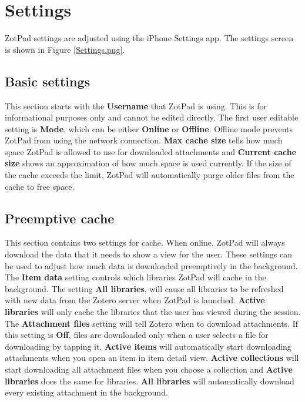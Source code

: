 \documentclass[oneside, openany, 12pt]{tufte-book}
\newcommand{\iphone}[1]{#1}
\newcommand{\ipad}[1]{}
\newcommand{\image}[2]{
	\center
	\fbox{\texttt{[image: images/iPhone/\{\#2]}}}

	\refstepcounter{figure}
	\smallskip\noindent\small Figure \thefigure: #1
	\label{#2}
	}
\newcommand{\iphone}[1]{}
\newcommand{\ipad}[1]{#1}
\newcommand{\image}[2]{
	\caption{#1}
	\label{#2}
	\fbox{\texttt{[image: images/iPad/\{\#2]}}}
	}
\begin{document}
\begin{figure}
\image{Conflict resolution}{Conflict.png}
\end{figure}

\clearpage

\chapter{Settings}
\label{Settings}

ZotPad settings are adjusted using the \ipad{iPad}\iphone{iPhone} Settings app. The settings screen is shown in Figure \ref{Settings.png}. 

\begin{figure}
\image{ZotPad settings}{Settings.png}
\end{figure}

\section{Basic settings}

This section starts with the \textbf{Username} that ZotPad is using. This is for informational purposes only and cannot be edited directly. The first user editable setting is \textbf{Mode}, which can be either \textbf{Online} or \textbf{Offline}. Offline mode prevents ZotPad from using the network connection. \textbf{Max cache size} tells how much space ZotPad is allowed to use for downloaded attachments and \textbf{Current cache size} shows an approximation of how much space is used currently. If the size of the cache exceeds the limit, ZotPad will automatically purge older files from the cache to free space.

\section{Preemptive cache}

This section contains two settings for cache. When online, ZotPad will always download the data that it needs to show a view for the user. These settings can be used to adjust how much data is downloaded preemptively in the background. The \textbf{Item data} setting controls which libraries ZotPad will cache in the background. The setting \textbf{All libraries}, will cause all libraries to be refreshed with new data from the Zotero server when ZotPad is launched. \textbf{Active libraries} will only cache the libraries that the user has viewed during the session. The \textbf{Attachment files} setting will tell Zotero when to download attachments. If this setting is \textbf{Off}, files are downloaded only when a user selects a file for downloading by tapping it. \textbf{Active items} will automatically start downloading attachments when you open an item in item detail view. \textbf{Active collections} will start downloading all attachment files when you choose a collection and \textbf{Active libraries} does the same for libraries. \textbf{All libraries} will automatically download every existing attachment in the background.
\end{document}
